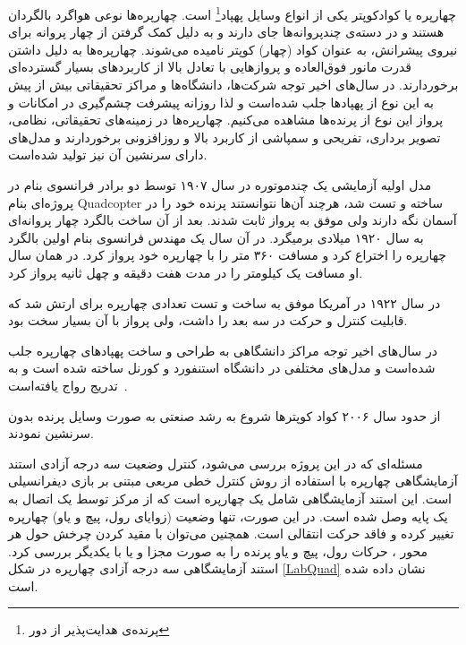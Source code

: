 


چهارپره یا کوادکوپتر یکی از انواع وسایل پهپاد\footnote{پرنده‌ی هدایت‌پذیر از دور} است. چهارپره‌ها نوعی هواگرد بالگردان هستند و در دسته‌ی چندپروانه‌ها جای دارند و به دلیل کمک گرفتن از چهار پروانه برای نیروی پیشرانش، به عنوان کواد (چهار) کوپتر نامیده می‌شوند. چهارپره‌ها به دلیل داشتن قدرت مانور فوق‌العاده و پروازهایی با تعادل بالا از کاربردهای بسیار گسترده‌ای برخوردارند.
در سال‌های اخیر توجه شرکت‌ها، دانشگاه‌ها و مراکز تحقیقاتی بیش از پیش به این نوع از پهپادها جلب شده‌است و لذا روزانه پیشرفت چشم‌گیری در امکانات و پرواز این نوع از پرنده‌ها مشاهده می‌کنیم. چهارپره‌ها در زمینه‌های تحقیقاتی، نظامی، تصویر برداری، تفریحی و سمپاشی از کاربرد بالا و روزافزونی برخوردارند و مدل‌های دارای سرنشین آن نیز تولید شده‌است.





مدل‬ اولیه آزمایشی یک چندموتوره در سال ۱۹۰۷ توسط دو برادر فرانسوی بنام  در پروژه‌ای بنام Quadcopter ساخته و تست شد، هرچند آن‌ها نتوانستند پرنده خود را در آسمان نگه دارند ولی موفق به پرواز ثابت شدند. بعد از آن ساخت بالگرد چهار پروانه‌ای به سال ۱۹۲۰ میلادی برمیگرد. در آن سال یک مهندس فرانسوی بنام  اولین بالگرد چهارپره را اختراع کرد و مسافت ۳۶۰ متر را با چهارپره خود پرواز کرد. در همان سال او مسافت یک کیلومتر را در مدت هفت دقیقه و چهل ثانیه پرواز کرد.

در  سال ۱۹۲۲ در آمریکا  موفق به ساخت و تست تعدادی چهارپره برای ارتش شد که قابلیت کنترل و حرکت در سه بعد را داشت، ولی پرواز با آن بسیار سخت بود.

در سال‌های اخیر توجه مراکز دانشگاهی به طراحی و ساخت پهپادهای چهارپره جلب شده‌است و مدل‌های مختلفی در دانشگاه استنفورد و کورنل ساخته شده است و به تدریج رواج یافته‌است~\cite{5717652}.

از حدود سال ۲۰۰۶ کواد کوپترها شروع به رشد صنعتی به صورت وسایل پرنده بدون سرنشین نمودند.


مسئله‌ای که در این پروژه بررسی می‌شود، کنترل وضعیت سه درجه آزادی استند آزمایشگاهی چهارپره با استفاده از روش کنترل خطی مربعی مبتنی بر بازی دیفرانسیلی است. این استند آزمایشگاهی شامل یک چهارپره است که از 
مرکز توسط یک اتصال به یک پایه وصل شده است. در این صورت، تنها وضعیت (زوایای رول، پیچ و یاو) 
چهارپره تغییر کرده و فاقد حرکت انتقالی است. همچنین می‌توان با مقید کردن چرخش حول هر محور ، 
حرکات رول، پیچ و یاو  پرنده را به صورت مجزا و یا با یکدیگر بررسی کرد.
استند آزمایشگاهی سه درجه آزادی چهارپره در شکل \ref{LabQuad} نشان داده شده ‌است.

